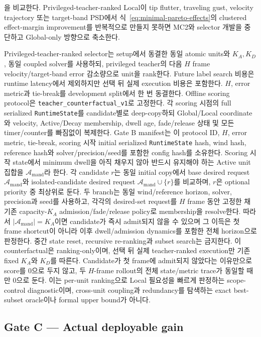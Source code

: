 \documentclass[11pt]{article}
\begin{document}
을 비교한다. Privileged-teacher-ranked Local이 tip flutter, traveling gust, velocity trajectory 또는
target-band PSD에서 식~\eqref{eq:minimal-pareto-effects}의 clustered effect-margin improvement를
반복적으로 만들지 못하면
MC2와 selector 개발을 중단하고 Global-only 방향으로 축소한다.

Privileged-teacher-ranked selector는 setup에서 동결한 동일 atomic units와 \(K_A,K_D\),
동일 coupled solver를 사용하되,
privileged teacher의 다음 \(H\) frame velocity/target-band error 감소량으로 unit을 rank한다.
Future label search 비용은 runtime latency에서 제외하지만 선택 뒤 실제 execution 비용은 포함한다.
\(H\), error metric과 tie-break를 development split에서 한 번 동결한다.
Offline scoring protocol은 \texttt{teacher\_counterfactual\_v1}로 고정한다. 각 scoring 시점의 full serialized
\texttt{RuntimeState}를 candidate별로 deep-copy하되 Global/Local coordinate와 velocity,
Active/Decay membership, dwell age, fade/release 상태 및 모든 timer/counter를 빠짐없이 복제한다.
Gate B manifest는 이 protocol ID, \(H\), error metric, tie-break, scoring 시작 initial serialized
\texttt{RuntimeState} hash, wind hash, reference hash와 solver/precision/seed를 포함한 config hash를 소유한다.
Scoring 시작 state에서 minimum dwell을 아직 채우지 않아 반드시 유지해야 하는 Active unit 집합을
\(\mathcal A_{\mathrm{mand}}\)라 한다. 각 candidate \(r\)는 동일 initial copy에서 base desired request
\(\mathcal A_{\mathrm{mand}}\)와 isolated-candidate desired request
\(\mathcal A_{\mathrm{mand}}\cup\{r\}\)를 비교하며, \(r\)은 optional priority 중 최상위로 둔다.
두 branch는 동일 wind/reference horizon, solver, precision과 seed를 사용하고, 각각의 desired-set request를
\(H\) frame 동안 고정한 채 기존 capacity-\(K_A\) admission/fade/release policy로 membership을 resolve한다.
따라서 \(|\mathcal A_{\mathrm{mand}}|=K_A\)이면 candidate가 즉시 admit되지 않을 수 있으며 그 이득은
첫 frame shortcut이 아니라 이후 dwell/admission dynamics를 포함한 전체 horizon으로 판정한다.
중간 state reset, recursive re-ranking과 subset search는 금지한다. 이 counterfactual은 ranking-only이며,
선택 뒤 실제 teacher-ranked execution만 기존 fixed \(K_A\)와 \(K_D\)를 따른다. Candidate가 첫 frame에
admit되지 않았다는 이유만으로 score를 0으로 두지 않고, 두 \(H\)-frame rollout의 전체 state/metric trace가
동일할 때만 0으로 둔다.
이는 per-unit ranking으로 Local 필요성을 빠르게 판정하는 scope-control diagnostic이며,
cross-unit coupling과 redundancy를 탐색하는 exact best-subset oracle이나 formal upper bound가 아니다.

\subsection{Gate C --- Actual deployable gain}
\end{document}

